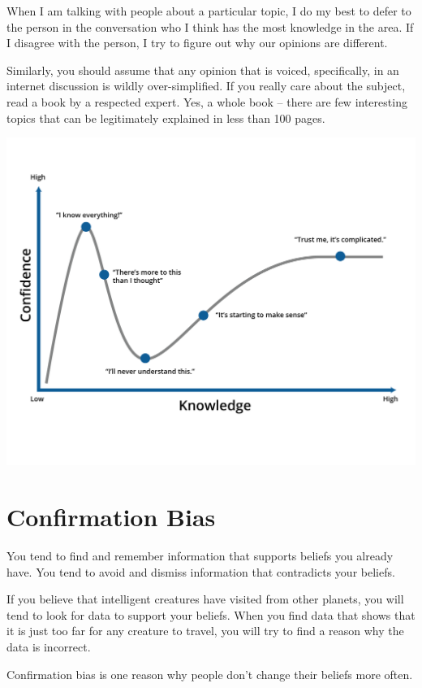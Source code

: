 When I am talking with people about a particular topic, I do my best
to defer to the person in the conversation who I think has the most
knowledge in the area. If I disagree with the person, I try to figure
out why our opinions are different.

Similarly, you should assume that any opinion that is voiced, specifically, in an
internet discussion is wildly over-simplified. If you really care
about the subject, read a book by a respected expert. Yes, a whole
book -- there are few interesting topics that can be legitimately
explained in less than 100 pages.

\includegraphics[width=1\textwidth]{dunningKruger.png}

\section{Confirmation Bias}

You tend to find and remember information that supports
beliefs you already have. You tend to avoid and dismiss information
that contradicts your beliefs.

If you believe that intelligent creatures have visited from other
planets, you will tend to look for data to support your beliefs. When
you find data that shows that it is just too far for any creature to
travel, you will try to find a reason why the data is incorrect.

Confirmation bias is one reason why people don't change their beliefs
more often.

